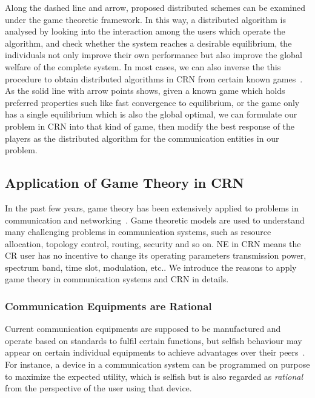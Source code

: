 Along the dashed line and arrow, proposed distributed schemes can be examined under the game theoretic framework.
In this way, a distributed algorithm is analysed by looking into the interaction among the users which operate the algorithm, and check whether the system reaches a desirable equilibrium, \ie the individuals not only improve their own performance but also improve the global welfare of the complete system.
In most cases, we can also inverse the this procedure to obtain distributed algorithms in CRN from certain known games~\cite{altman_Smodel_pc_2003}.
As the solid line with arrow points shows, given a known game which holds preferred properties such like fast convergence to equilibrium, or the game only has a single equilibrium which is also the global optimal, we can formulate our problem in CRN into that kind of game, then modify the best response of the players as the distributed algorithm for the communication entities in our problem. 



\subsection{Application of Game Theory in CRN}

In the past few years, game theory has been extensively applied to problems in communication and networking~\cite{Neel06analysisand, Wang_gtc_crn_survey_2010}.
Game theoretic models are used to understand many challenging problems in communication systems, such as resource allocation, topology control, routing, security and so on. 
NE in CRN means the CR user has no incentive to change its operating parameters \eg transmission power, spectrum band, time slot, modulation, etc.. 
We introduce the reasons to apply game theory in communication systems and CRN in details.

\subsubsection{Communication Equipments are Rational}
Current communication equipments are supposed to be manufactured and operate based on standards to fulfil certain functions, but selfish behaviour may appear on certain individual equipments to achieve advantages over their peers~\cite{game_for_communication_01}.
For instance, a device in a communication system can be programmed on purpose to maximize the expected utility, which is selfish but is also regarded as \textit{rational} from the perspective of the user using that device.

